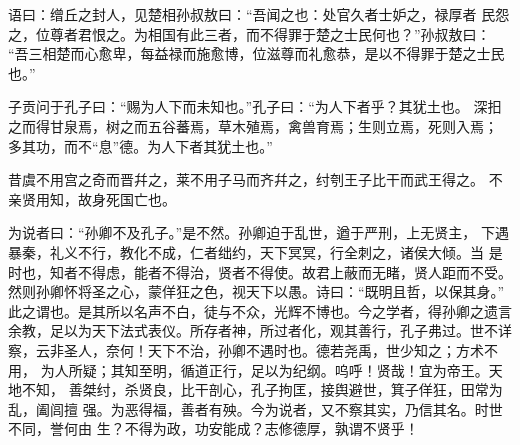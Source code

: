 \documentclass[]{article}
\begin{document}
语曰：缯丘之封人，见楚相孙叔敖曰：``吾闻之也：处官久者士妒之，禄厚者
民怨之，位尊者君恨之。为相国有此三者，而不得罪于楚之士民何也？''孙叔敖曰：
``吾三相楚而心愈卑，每益禄而施愈博，位滋尊而礼愈恭，是以不得罪于楚之士民
也。''

子贡问于孔子曰：``赐为人下而未知也。''孔子曰：``为人下者乎？其犹土也。
深抇之而得甘泉焉，树之而五谷蕃焉，草木殖焉，禽兽育焉；生则立焉，死则入焉；
多其功，而不``息''德。为人下者其犹土也。''

昔虞不用宫之奇而晋幷之，莱不用子马而齐幷之，纣刳王子比干而武王得之。
不亲贤用知，故身死国亡也。

为说者曰：``孙卿不及孔子。''是不然。孙卿迫于乱世，遒于严刑，上无贤主，
下遇暴秦，礼义不行，教化不成，仁者绌约，天下冥冥，行全刺之，诸侯大倾。当
是时也，知者不得虑，能者不得治，贤者不得使。故君上蔽而无睹，贤人距而不受。
然则孙卿怀将圣之心，蒙佯狂之色，视天下以愚。诗曰：``既明且哲，以保其身。''
此之谓也。是其所以名声不白，徒与不众，光辉不博也。今之学者，得孙卿之遗言
余教，足以为天下法式表仪。所存者神，所过者化，观其善行，孔子弗过。世不详
察，云非圣人，奈何！天下不治，孙卿不遇时也。德若尧禹，世少知之；方术不用，
为人所疑；其知至明，循道正行，足以为纪纲。呜呼！贤哉！宜为帝王。天地不知，
善桀纣，杀贤良，比干剖心，孔子拘匡，接舆避世，箕子佯狂，田常为乱，阖闾擅
强。为恶得福，善者有殃。今为说者，又不察其实，乃信其名。时世不同，誉何由
生？不得为政，功安能成？志修德厚，孰谓不贤乎！
\end{document}
